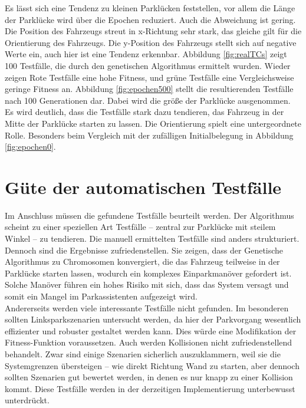 \documentclass[12pt,a4paper]{article}
\begin{document}
Es lässt sich eine Tendenz zu kleinen Parklücken feststellen, vor allem die Länge der Parklücke wird über die Epochen reduziert. Auch die Abweichung ist gering. Die Position des Fahrzeugs streut in x-Richtung sehr stark, das gleiche gilt für die Orientierung des Fahrzeugs. Die y-Position des Fahrzeugs stellt sich auf negative Werte ein, auch hier ist eine Tendenz erkennbar. Abbildung \ref{fig:realTCs} zeigt 100 Testfälle, die durch den genetischen Algorithmus ermittelt wurden. Wieder zeigen Rote Testfälle eine hohe Fitness, und grüne Testfälle eine Vergleichsweise geringe Fitness an. Abbildung \ref{fig:epochen500} stellt die resultierenden Testfälle nach 100 Generationen dar. Dabei wird die größe der Parklücke ausgenommen. Es wird deutlich, dass die Testfälle stark dazu tendieren, das Fahrzeug in der Mitte der Parklücke starten zu lassen. Die Orientierung spielt eine untergeordnete Rolle. Besonders beim Vergleich mit der zufälligen Initialbelegung in Abbildung \ref{fig:epochen0}.

\section{Güte der automatischen Testfälle}
Im Anschluss müssen die gefundene Testfälle beurteilt werden. Der Algorithmus scheint zu einer speziellen Art Testfälle -- zentral zur Parklücke mit steilem Winkel -- zu tendieren. Die manuell ermittelten Testfälle sind anders strukturiert.\\
Dennoch sind die Ergebnisse zufriedenstellen. Sie zeigen, dass der Genetische Algorithmus zu Chromosomen konvergiert, die das Fahrzeug teilweise in der Parklücke starten lassen, wodurch ein komplexes Einparkmanöver gefordert ist. Solche Manöver führen ein hohes Risiko mit sich, dass das System versagt und somit ein Mangel im Parkassistenten aufgezeigt wird.\\
Andererseits werden viele interessante Testfälle nicht gefunden. Im besonderen sollten Linksparkszenarien untersucht werden, da hier der Parkvorgang wesentlich effizienter und robuster gestaltet werden kann. Dies würde eine Modifikation der Fitness-Funktion voraussetzen. Auch werden Kollisionen nicht zufriedenstellend behandelt. Zwar sind einige Szenarien sicherlich auszuklammern, weil sie die Systemgrenzen übersteigen -- wie direkt Richtung Wand zu starten, aber dennoch sollten Szenarien gut bewertet werden, in denen es nur knapp zu einer Kollision kommt. Diese Testfälle werden in der derzeitigen Implementierung unterbewusst unterdrückt.
\end{document}
